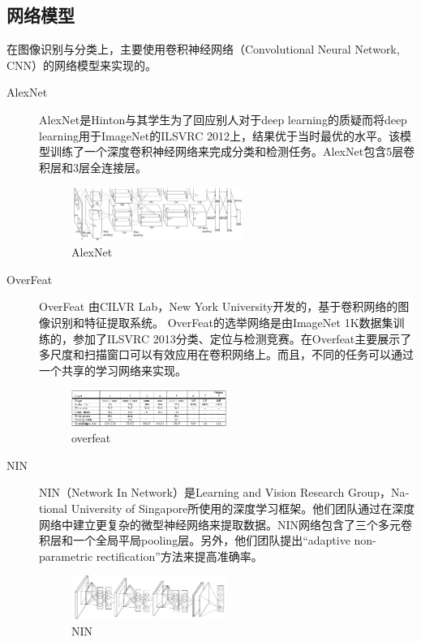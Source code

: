 \documentclass[12pt]{article}
\begin{document}
\subsection{网络模型}
在图像识别与分类上，主要使用卷积神经网络（Convolutional Neural Network, CNN）的网络模型来实现的。
\begin{description}
\item [AlexNet] AlexNet\cite{krizhevsky2012imagenet}是Hinton与其学生为了回应别人对于deep learning的质疑而将deep learning用于ImageNet的ILSVRC 2012上，结果优于当时最优的水平。该模型训练了一个深度卷积神经网络来完成分类和检测任务。AlexNet包含5层卷积层和3层全连接层。
\begin{figure}[!ht]
\centering
\includegraphics[width=0.55\textwidth]{AlexNet}
\caption{AlexNet}
\end{figure}


\item[OverFeat] OverFeat\cite{sermanet2013overfeat}%
由CILVR Lab，New York University开发的，基于卷积网络的图像识别和特征提取系统。
OverFeat的选举网络是由ImageNet 1K数据集训练的，参加了ILSVRC 2013分类、定位与检测竞赛。在Overfeat主要展示了多尺度和扫描窗口可以有效应用在卷积网络上。而且，不同的任务可以通过一个共享的学习网络来实现。
\begin{figure}[!ht]
\centering
\includegraphics[width=0.5\textwidth]{overfeat}
\caption{overfeat}
\end{figure}

\item[NIN] NIN（Network In Network）\cite{Lin:2013aa}是Learn­ing and Vi­sion Re­search Group，Na­tion­al Uni­ver­si­ty of Sin­ga­pore所使用的深度学习框架。他们团队通过在深度网络中建立更复杂的微型神经网络来提取数据。NIN网络包含了三个多元卷积层和一个全局平局pooling层。另外，他们团队提出``adaptive non-parametric rectification''方法来提高准确率。 
\begin{figure}[!ht]
\centering
\includegraphics[width=0.5\textwidth]{NIN}
\caption{NIN}
\end{figure}


\end{description}
\end{document}

